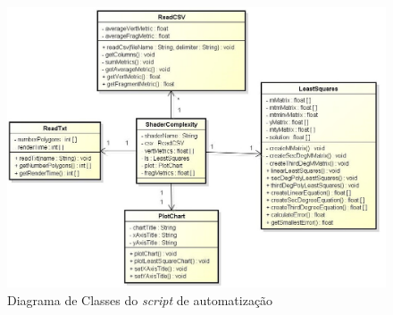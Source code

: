 	\begin{figure}[ht]
	\centering
		\includegraphics[keepaspectratio=true,scale=0.58]{figuras/minquad_diag.jpg}
	\caption{Diagrama de Classes do \textit{script} de automatização}
	\label{minquad_diag}
	\end{figure}

